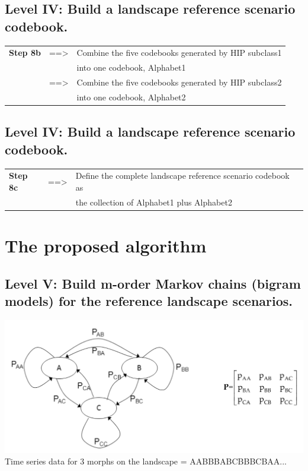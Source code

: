 \documentclass[
paper=128mm:96mm, %
fontsize=11pt, %
pagesize, %
parskip=half-, %
]{scrartcl} %
\theoremstyle{mythmstyle} %
\begin{document}
\clearpage
\subsection{Level IV: Build a landscape reference scenario codebook.}
\footnotesize 
\begin{tabular}{lll}
	\textbf{Step 8b} & ==> & Combine the five codebooks generated by HIP subclass1\\
	& & into one codebook, Alphabet1\\
	& ==> & Combine the five codebooks generated by HIP subclass2\\
	& & into one codebook, Alphabet2
\end{tabular}

\clearpage
\subsection{Level IV: Build a landscape reference scenario codebook.}
\footnotesize 
\begin{tabular}{lll}
	\textbf{Step 8c} & ==> & Define the complete landscape reference scenario codebook as\\
	& & the collection of Alphabet1 plus Alphabet2
\end{tabular}

\clearpage
\section{The proposed algorithm}
\subsection{Level V: Build m-order Markov chains (bigram models) for the reference landscape scenarios.}
\includegraphics[height=3 cm]{Image23.jpg}\\
\footnotesize Time series data for 3 morphs on the landscape = {AABBBABCBBBCBAA...}
\clearpage
\end{document}

